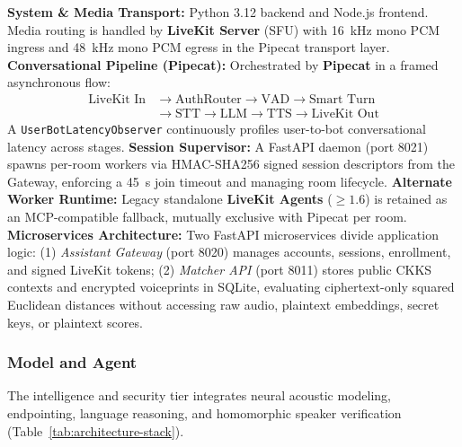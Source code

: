 \textbf{System \& Media Transport:} Python 3.12 backend and Node.js frontend. Media routing is handled by \textbf{LiveKit Server} (SFU) with 16~kHz mono PCM ingress and 48~kHz mono PCM egress in the Pipecat transport layer.
\textbf{Conversational Pipeline (Pipecat):} Orchestrated by \textbf{Pipecat} in a framed asynchronous flow:
\begin{equation}
\begin{aligned}
    \text{LiveKit In} &\longrightarrow \text{AuthRouter} \longrightarrow \text{VAD} \longrightarrow \text{Smart Turn} \\
    &\longrightarrow \text{STT} \longrightarrow \text{LLM} \longrightarrow \text{TTS} \longrightarrow \text{LiveKit Out}
\end{aligned}
\end{equation}
A \texttt{UserBotLatencyObserver} continuously profiles user-to-bot conversational latency across stages.
\textbf{Session Supervisor:} A FastAPI daemon (port 8021) spawns per-room workers via HMAC-SHA256 signed session descriptors from the Gateway, enforcing a 45~s join timeout and managing room lifecycle.
\textbf{Alternate Worker Runtime:} Legacy standalone \textbf{LiveKit Agents} ($\ge 1.6$) is retained as an MCP-compatible fallback, mutually exclusive with Pipecat per room.
\textbf{Microservices Architecture:} Two FastAPI microservices divide application logic: (1) \emph{Assistant Gateway} (port 8020) manages accounts, sessions, enrollment, and signed LiveKit tokens; (2) \emph{Matcher API} (port 8011) stores public CKKS contexts and encrypted voiceprints in SQLite, evaluating ciphertext-only squared Euclidean distances without accessing raw audio, plaintext embeddings, secret keys, or plaintext scores.

\subsubsection{Model and Agent}

The intelligence and security tier integrates neural acoustic modeling, endpointing, language reasoning, and homomorphic speaker verification (Table~\ref{tab:architecture-stack}).

